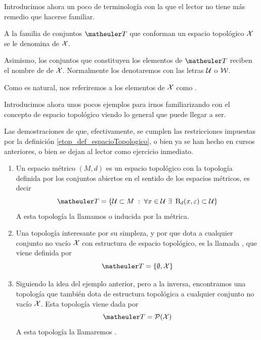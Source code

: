 Introducimos ahora un poco de terminología con la que el lector no tiene más remedio que hacerse familiar.
\begin{obs}[Terminología]
	\label{etop_obs_terminologia}
	A la familia de conjuntos $\T$ que conforman un espacio topológico $\mathcal{X}$ se le denomina  de $\mathcal{X}$.
	
	Asimismo, los conjuntos que constituyen los elementos de $\T$ reciben el nombre de  de $\mathcal{X}$. Normalmente los denotaremos con las letras $\mathcal{U}$ o $\mathcal{W}$.
	
	Como es natural, nos referiremos a los elementos de $\mathcal{X}$ como .
\end{obs}
Introducimos ahora unos pocos ejemplos para irnos familiarizando con el concepto de espacio topológico viendo lo general que puede llegar a ser.
\begin{exa}[Topologías]
	\label{etop_exa_topologias}
	Las demostraciones de que, efectivamente, se cumplen las restricciones impuestas por la definición \ref{etop_def_espacioTopologico}, o bien ya se han hecho en cursos anteriores, o bien se dejan al lector como ejercicio inmediato.
	\begin{enumerate}
		\item Un espacio métrico $(M,d)$ es un espacio topológico con la topología definida por los conjuntos abiertos en el sentido de los espacios métricos, es decir
		\begin{equation}
		\label{etop_eq_topologiaRn}
		\T = \{\U\subset M\midc \forall x\in\U\ \exists\  \bola_{d}(x,\varepsilon)\subset\U\}
		\end{equation}
		A esta topología la llamamos  o inducida por la métrica.
		\item Una topología interesante por su simpleza, y por que dota a cualquier conjunto no vacío $\mathcal{X}$ con estructura de espacio topológico, es la llamada , que viene definida por \begin{equation}
		\label{etop_eq_topologiaTrivial}
		\T=\{\emptyset, \X\}
		\end{equation}
		\item Siguiendo la idea del ejemplo anterior, pero a la inversa, encontramos una topología que también dota de estructura topológica a cualquier conjunto no vacío $\mathcal{X}$. Esta topología viene dada por
		\begin{equation}
		\label{etop_eq_topologiaDiscreta}
		\T = \partes(\X)
		\end{equation}
		A esta topología la llamaremos .
		

\end{enumerate}
\end{exa}
